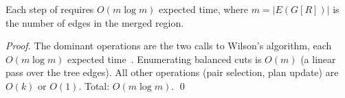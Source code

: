 \begin{proposition}
\label{prop:cost}
Each step of \mergesplit{} requires $O(m \log m)$ expected time, where
$m = |E(G[R])|$ is the number of edges in the merged region.
\end{proposition}

\begin{proof}
The dominant operations are the two calls to Wilson's algorithm, each
$O(m \log m)$ expected time~\citep{wilson1996}.
Enumerating balanced cuts is $O(m)$ (a linear pass over the tree edges).
All other operations (pair selection, plan update) are $O(k)$ or $O(1)$.
Total: $O(m \log m)$. \qed
\end{proof}
